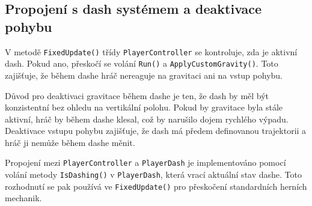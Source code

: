 \subsection{Propojení s dash systémem a deaktivace pohybu}

V metodě \texttt{FixedUpdate()} třídy \texttt{PlayerController} se kontroluje, zda je aktivní dash. Pokud ano, přeskočí se volání \texttt{Run()} a \texttt{ApplyCustomGravity()}. Toto zajišťuje, že během dashe hráč nereaguje na gravitaci ani na vstup pohybu.

Důvod pro deaktivaci gravitace během dashe je ten, že dash by měl být konzistentní bez ohledu na vertikální polohu. Pokud by gravitace byla stále aktivní, hráč by během dashe klesal, což by narušilo dojem rychlého výpadu. Deaktivace vstupu pohybu zajišťuje, že dash má předem definovanou trajektorii a hráč ji nemůže během dashe měnit.

Propojení mezi \texttt{PlayerController} a \texttt{PlayerDash} je implementováno pomocí volání metody \texttt{IsDashing()} v \texttt{PlayerDash}, která vrací aktuální stav dashe. Toto rozhodnutí se pak používá ve \texttt{FixedUpdate()} pro přeskočení standardních herních mechanik.